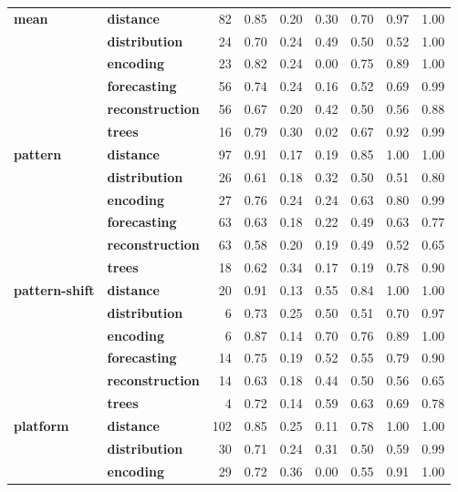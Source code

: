 \begin{table}[p]
\begin{tabular}{llrllllll}
\cline{1-9}
\multirow[t]{6}{*}{\textbf{mean}} & \textbf{distance} & 82 & 0.85 & 0.20 & 0.30 & 0.70 & 0.97 & 1.00 \\
\textbf{} & \textbf{distribution} & 24 & 0.70 & 0.24 & 0.49 & 0.50 & 0.52 & 1.00 \\
\textbf{} & \textbf{encoding} & 23 & 0.82 & 0.24 & 0.00 & 0.75 & 0.89 & 1.00 \\
\textbf{} & \textbf{forecasting} & 56 & 0.74 & 0.24 & 0.16 & 0.52 & 0.69 & 0.99 \\
\textbf{} & \textbf{reconstruction} & 56 & 0.67 & 0.20 & 0.42 & 0.50 & 0.56 & 0.88 \\
\textbf{} & \textbf{trees} & 16 & 0.79 & 0.30 & 0.02 & 0.67 & 0.92 & 0.99 \\
\cline{1-9}
\multirow[t]{6}{*}{\textbf{pattern}} & \textbf{distance} & 97 & 0.91 & 0.17 & 0.19 & 0.85 & 1.00 & 1.00 \\
\textbf{} & \textbf{distribution} & 26 & 0.61 & 0.18 & 0.32 & 0.50 & 0.51 & 0.80 \\
\textbf{} & \textbf{encoding} & 27 & 0.76 & 0.24 & 0.24 & 0.63 & 0.80 & 0.99 \\
\textbf{} & \textbf{forecasting} & 63 & 0.63 & 0.18 & 0.22 & 0.49 & 0.63 & 0.77 \\
\textbf{} & \textbf{reconstruction} & 63 & 0.58 & 0.20 & 0.19 & 0.49 & 0.52 & 0.65 \\
\textbf{} & \textbf{trees} & 18 & 0.62 & 0.34 & 0.17 & 0.19 & 0.78 & 0.90 \\
\cline{1-9}
\multirow[t]{6}{*}{\textbf{pattern-shift}} & \textbf{distance} & 20 & 0.91 & 0.13 & 0.55 & 0.84 & 1.00 & 1.00 \\
\textbf{} & \textbf{distribution} & 6 & 0.73 & 0.25 & 0.50 & 0.51 & 0.70 & 0.97 \\
\textbf{} & \textbf{encoding} & 6 & 0.87 & 0.14 & 0.70 & 0.76 & 0.89 & 1.00 \\
\textbf{} & \textbf{forecasting} & 14 & 0.75 & 0.19 & 0.52 & 0.55 & 0.79 & 0.90 \\
\textbf{} & \textbf{reconstruction} & 14 & 0.63 & 0.18 & 0.44 & 0.50 & 0.56 & 0.65 \\
\textbf{} & \textbf{trees} & 4 & 0.72 & 0.14 & 0.59 & 0.63 & 0.69 & 0.78 \\
\cline{1-9}
\multirow[t]{6}{*}{\textbf{platform}} & \textbf{distance} & 102 & 0.85 & 0.25 & 0.11 & 0.78 & 1.00 & 1.00 \\
\textbf{} & \textbf{distribution} & 30 & 0.71 & 0.24 & 0.31 & 0.50 & 0.59 & 0.99 \\
\textbf{} & \textbf{encoding} & 29 & 0.72 & 0.36 & 0.00 & 0.55 & 0.91 & 1.00 \\

\end{tabular}
\end{table}
